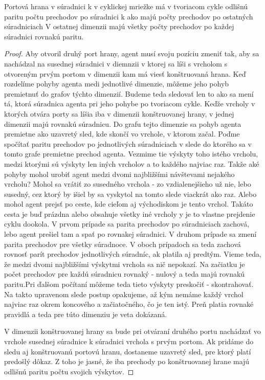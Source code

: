 \begin{lem}
Portová hrana v súradnici k v cyklickej mriežke má v tvoriacom cykle 
odlišnú paritu počtu prechodov po súradnici k ako majú počty prechodov 
po ostatných súradniciach
V ostatnej dimenzii majú všetky počty prechodov po každej súradnici 
rovnakú paritu.
\end{lem}
\begin{proof}
Aby otvoril druhý port hrany, agent musí svoju pozíciu zmeniť tak, 
aby sa nachádzal na susednej súradnici v diemnzii v ktorej sa líši s
vrcholom s otvoreným prvým portom v dimenzii kam má viesť konštruovaná hrana.
Keď rozdelíme pohyby agenta medi jednotlivé dimenzie, môžeme jeho pohyb
premietnuť do grafov týchto dimenzií. Budeme teda sledovať len to ako sa
mení tá, ktorá súradnica agenta pri jeho pohybe po tvoriacom cykle.
Keďže vrcholy v ktorých otvára porty sa líšia iba v dimenzii konštruovanej
hrany, v jednej dimenzii majú rovnakú súradnicu. Do grafu tejto dimenzie sa
pohyb agenta premietne ako uzavretý sled, kde skončí vo vrchole, v ktorom
začal.
Poďme spočítať paritu prechodov po jednotlivých súradniciach v slede do
ktorého sa v tomto grafe premietne prechod agenta.  Vezmime tie výskyty toho
istého vrcholu, medzi ktorými sú výskyty len iných vrcholov a to každého 
najviac raz. Takže aké pohyby mohol urobiť agent medzi dvomi najbližšími
návštevami nejakého vrcholu? Mohol sa vrátiť zo susedného vrchola - zo
vzdialenejšieho už nie, lebo susedný, cez ktorý by išiel by sa vyskytol na
tomto slede viackrát ako raz. 
Alebo mohol agent prejsť po ceste, kde cieľom
aj východiskom je tento vrchol. Takáto cesta je buď prázdna alebo obsahuje
všetky iné vrcholy y je to vlastne prejdenie cyklu dookola.
V prvom prípade sa parita prechodov po súradniciach zachová, lebo agent
prešiel tam a spať po rovnakej súradnici. V druhom prípade sa zmení parita
prechodov pre všetky súradnoce. V oboch prípadoch sa teda zachová rovnosť
parít prechodov jednotlivých súradníc, ak platila aj predtým. 
Vieme teda, že medzi dvomi najbližšími výskytmi vrchola sa nič nepokazí. Na
začiatku je počet prechodov pre každú súradnicu rovnaký - nulový a teda majú
rovnakú paritu.Pri ďalšom počítaní môžeme teda tieto výskyty preskočiť -
skontrahovať. Na takto upravenom slede postup opakujeme, až kým nemáme každý
vrchol najviac raz okrem koncového a začiatočného, čo je ten istý. Preň
platia rovnaké pravidlá a teda pre túto dimenziu je veta dokázaná.


V dimenzii konštruovanej hrany sa bude pri otváraní druhého portu nachádzať
vo vrchole susednej súradnice k súradnici vrchola s prvým portom.
Ak pridáme do sledu aj konštruovanú portovú hranu, dostaneme uzavretý sled, pre ktorý
platí predošlý dôkaz. Z toho je jasné, že iba prechody po konštruovanej
hrane majú odlišnú paritu počtu svojich výskytov.
\end{proof}




